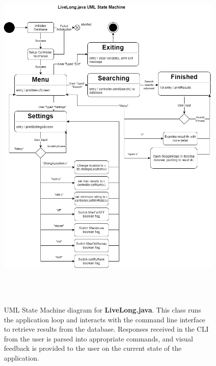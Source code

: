 \documentclass[12pt]{article}
\begin{document}
\begin{center}
\begin{figure}
\includegraphics[height=18cm]{Pictures/LiveLong StateMachine.png}
\caption{UML State Machine diagram for \textbf{LiveLong.java}. This class runs the application loop and interacts with the command line interface to retrieve results from the database. Responses received in the CLI from the user is parsed into appropriate commands, and visual feedback is provided to the user on the current state of the application.}
\label{fig:LiveLongStateUML}
\end{figure}
\end{center}

\newpage
\end{document}
